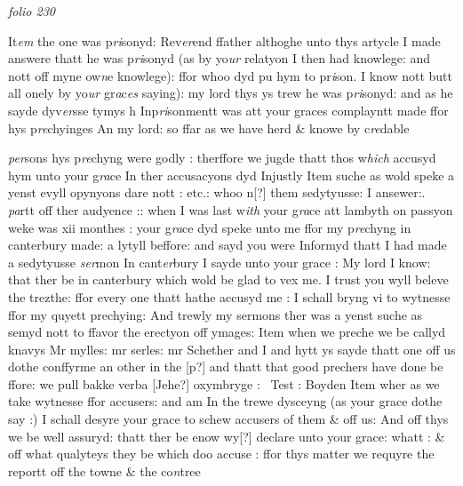 \documentclass[12pt, a4paper]{book}
\begin{document}
\dotfill
					

\textit{folio 230}


It\textit{em} the one was p\textit{ri}sonyd: Rev\textit{er}end ffather althoghe unto thys artycle I made answere thatt he was p\textit{ri}sonyd (as by yo\textit{ur} relatyon I then had knowlege: and nott off myne ow\textit{n}e knowlege): ffor whoo dyd pu hym to pr\textit{i}son. I know nott butt all onely by yo\textit{ur} gr\textit{a}c\textit{es }saying): my lord thys ys trew he was p\textit{ri}sonyd: and as he sayde dyv\textit{er}sse tymys h
                      Inp\textit{ri}sonmentt was att your graces complayntt made ffor hys p\textit{re}chyinges An my lord: so ffar as we have herd \& knowe by c\textit{re}dable \textit{}
                              
                                 \textit{per}sons
			 hys p\textit{re}chyng were godly : therffore we jugde thatt thos w\textit{hich} accusyd hym unto your g\textit{ra}ce In ther accusacyons dyd Injustly Item suche as wold speke a yenst evyll opynyons dare nott : etc.: whoo n[?] them sedytyusse: I ansewer:. \textit{pa}rtt off ther audyence :: when I was last w\textit{ith} your g\textit{ra}ce att lambyth on passyon weke was xii monthes : your g\textit{ra}ce dyd speke unto me ffor my p\textit{re}chyng in canterbury made: a lytyll beffore: and sayd  you were Informyd thatt I had made a sedytyusse \textit{ser}mon In cant\textit{er}bury I sayde unto your grace : My lord I know: that ther be in canterbury which wold be glad to vex me. I trust you wyll beleve the trezthe: ffor every one thatt hathe accusyd me : I schall bryng vi to wytnesse ffor my  quyett prechying: And trewly my sermons ther was a yenst suche as semyd nott to ffavor the erectyon off ymages:  Item when we preche we be callyd knavys Mr mylles: mr serles: mr Schether and I and hytt ys sayde thatt one off us dothe conffyrme an other in the [p?] and thatt that good prechers have done be ffore: we pull bakke verba [Jehe?] oxymbryge :  Test : Boyden Item wher as we take wytnesse ffor accusers: and am In the trewe dysceyng (as your grace dothe say :) I schall desyre your grace to schew accusers of them \& off us: And off thys we be well assuryd: thatt ther
			 be enow wy[?]
                                              declare unto your grace: whatt : \& off what qualyteys they be which doo accuse
			 : ffor thys matter 
			we requyre the reportt off the towne \& the co\textit{n}tree 
                                          
\end{document}
